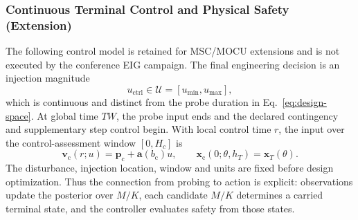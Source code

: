 \documentclass[journal]{IEEEtran}
\begin{document}
\subsubsection{Continuous Terminal Control and Physical Safety (Extension)}
The following control model is retained for MSC/MOCU extensions and is not
executed by the conference EIG campaign.
The final engineering decision is an injection magnitude
\begin{equation}
u_{\mathrm{ctrl}}\in\mathcal U=[u_{\min},u_{\max}],
\label{eq:control-space}
\end{equation}
which is continuous and distinct from the probe duration in
Eq.~\eqref{eq:design-space}. At global time $TW$, the probe input ends and
the declared contingency and supplementary step control begin. With local
control time $r$, the input over the control-assessment window $[0,H_c]$ is
\begin{equation}
\mathbf v_{\mathrm c}(r;u)=\mathbf p_{\mathrm c}+\mathbf a(b_{\mathrm c})u,
\qquad \mathbf x_{\mathrm c}(0;\theta,h_T)=\mathbf x_T(\theta).
\label{eq:control-input}
\end{equation}
The disturbance, injection location, window and units are fixed before design
optimization. Thus the connection from probing to action is explicit:
observations update the posterior over $M/K$, each candidate $M/K$ determines
a carried terminal state, and the controller evaluates safety from those states.
\end{document}
